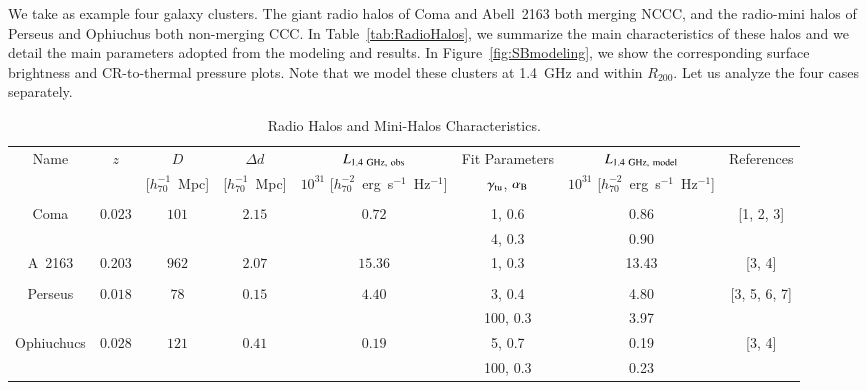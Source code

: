 \documentclass[traditabstract]{aa}
\begin{document}
We take as example four galaxy clusters. The giant radio halos of Coma \citep{1997A&A...321...55D} and Abell~2163 \citep{2001A&A...373..106F,2009A&A...499..679M} both merging NCCC, and the radio-mini halos of Perseus \citep{1990MNRAS.246..477P} and Ophiuchus \citep{2009A&A...499..371G,2009A&A...499..679M} both non-merging CCC. In Table~\ref{tab:RadioHalos}, we summarize the main characteristics of these halos and we detail the main parameters adopted from the modeling and results. In Figure~\ref{fig:SBmodeling}, we show the corresponding surface brightness and CR-to-thermal pressure plots. Note that we model these clusters at 1.4~GHz and within $R_{200}$. 
Let us analyze the four cases separately. 

\begin{table}[t]
\begin{center}
\caption{Radio Halos and Mini-Halos Characteristics.}
\medskip
\begin{tabular}{cccccccc}
\hline
\phantom{\Big|}
Name & $z$ & $D$ & $\Delta d$ & $L_{1.4~\rm{GHz},~\rm{obs}}$ & Fit Parameters & $L_{1.4~\rm{GHz},~\rm{model}}$ & References \\
\phantom{\Big|}
           &   & [$h_{70}^{-1}$~Mpc] & [$h_{70}^{-1}$~Mpc] & $10^{31}$ [$h_{70}^{-2}$~erg~s$^{-1}$~Hz$^{-1}$] & $\gamma_{\rm{tu}}$, $\alpha_{\rm{B}}$ & $10^{31}$ [$h_{70}^{-2}$~erg~s$^{-1}$~Hz$^{-1}$] & \\
\hline \\[-0.5em]
Coma           & $0.023$ & $101$ & $2.15$ & $0.72$  & 1, 0.6  & 0.86 &  [1, 2, 3]   \\
               &         &       &        &                        & 4, 0.3  & 0.90  &  \\
A~2163         & $0.203$ & $962$ & $2.07$ & $15.36$     & 1, 0.3  & 13.43  &  [3, 4]  \\
\hline \\[-0.5em]
Perseus        & $0.018$ & $78$   & $0.15$ & $4.40$ & 3, 0.4   & 4.80 &  [3, 5, 6, 7]  \\
               &         &        &        &                       & 100, 0.3 & 3.97 &  \\
Ophiuchucs     & $0.028$ & $121$  & $0.41$ & $0.19$       & 5, 0.7   & 0.19  &  [3, 4] \\
               &         &        &        &                       & 100, 0.3 & 0.23 &   \\[0.5em]
\hline
\end{tabular}

\end{center}
\end{table}
\end{document}
